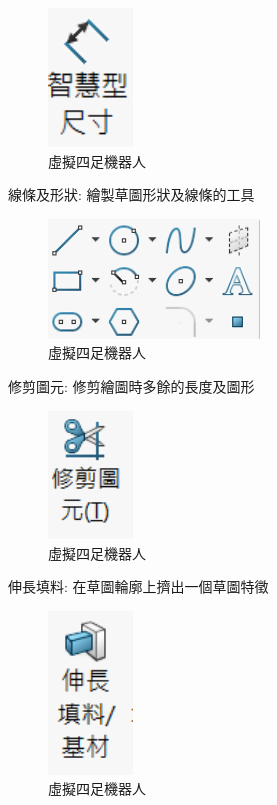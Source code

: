 \begin{figure}[h!]
    \centering
    \includegraphics[width=0.2\textwidth]{./../images/6-1-4.png}
    \caption{\Large 虛擬四足機器人}
\end{figure}

\noindent 線條及形狀: 繪製草圖形狀及線條的工具

\begin{figure}[h!]
    \centering
    \includegraphics[width=0.5\textwidth]{./../images/6-1-5.png}
    \caption{\Large 虛擬四足機器人}
\end{figure}

\noindent 修剪圖元: 修剪繪圖時多餘的長度及圖形

\begin{figure}[h!]
    \centering
    \includegraphics[width=0.2\textwidth]{./../images/6-1-6.png}
    \caption{\Large 虛擬四足機器人}
\end{figure}

\noindent 伸長填料: 在草圖輪廓上擠出一個草圖特徵

\begin{figure}[h!]
    \centering
    \includegraphics[width=0.2\textwidth]{./../images/6-1-7.png}
    \caption{\Large 虛擬四足機器人}
\end{figure}

